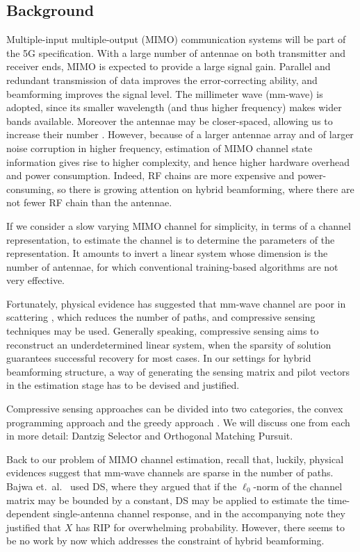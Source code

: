 \documentclass[journal]{IEEEtran}
\newcommand {\m} [1] {\( #1 \)}
\begin{document}
\subsection {Background}

Multiple-input multiple-output (MIMO) communication systems will be part of the 5G specification.
With a large number of antennae on both transmitter and receiver ends, MIMO is expected to provide a large signal gain.
Parallel and redundant transmission of data improves the error-correcting ability, and beamforming improves the signal level.
The millimeter wave (mm-wave) is adopted, since its smaller wavelength (and thus higher frequency) makes wider bands available.
Moreover the antennae may be closer-spaced, allowing us to increase their number \cite {RSM13}.
However, because of a larger antennae array and of larger noise corruption in higher frequency, estimation of MIMO channel state information gives rise to higher complexity, and hence higher hardware overhead and power consumption.
Indeed, RF chains are more expensive and power-consuming, so there is growing attention on hybrid beamforming, where there are not fewer RF chain than the antennae.

If we consider a slow varying MIMO channel for simplicity, in terms of a channel representation, to estimate the channel is to determine the parameters of the representation.
It amounts to invert a linear system whose dimension is the number of antennae, for which conventional training-based algorithms are not very effective.

Fortunately, physical evidence has suggested that mm-wave channel are poor in scattering \cite {ALS14}, which reduces the number of paths, and compressive sensing techniques may be used.
Generally speaking, compressive sensing aims to reconstruct an underdetermined linear system, when the sparsity of solution guarantees successful recovery for most cases.
In our settings for hybrid beamforming structure, a way of generating the sensing matrix and pilot vectors in the estimation stage has to be devised and justified.

Compressive sensing approaches can be divided into two categories, the convex programming approach and the greedy approach \cite {RDD18}.
We will discuss one from each in more detail: Dantzig Selector and Orthogonal Matching Pursuit.

Back to our problem of MIMO channel estimation, recall that, luckily, physical evidences suggest that mm-wave channels are sparse in the number of paths.
Bajwa et.\ al.\ \cite {BHS10} used DS, where they argued that if the \m {\ell_0}-norm of the channel matrix may be bounded by a constant, DS may be applied to estimate the time-dependent single-antenna channel response,
and in the accompanying note \cite {BHR08} they justified that \m {X} has RIP for overwhelming probability.
However, there seems to be no work by now which addresses the constraint of hybrid beamforming.
\end{document}
